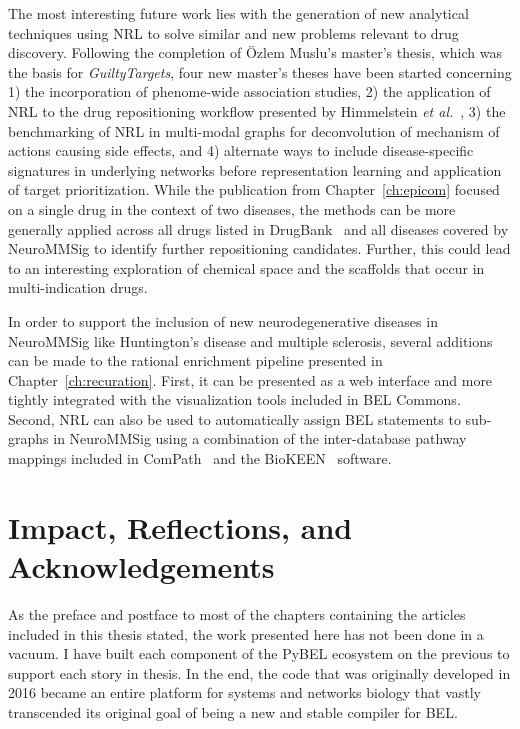 The most interesting future work lies with the generation of new analytical techniques using \ac{NRL} to solve similar and new problems relevant to drug discovery.
Following the completion of \"{O}zlem Muslu's master's thesis, which was the basis for \textit{GuiltyTargets}, four new master's theses have been started concerning 1) the incorporation of phenome-wide association studies, 2) the application of \ac{NRL} to the drug repositioning workflow presented by Himmelstein \textit{et al.}~\cite{Himmelstein2017}, 3) the benchmarking of \ac{NRL} in multi-modal graphs for deconvolution of mechanism of actions causing side effects, and 4) alternate ways to include disease-specific signatures in underlying networks before representation learning and application of target prioritization.
While the publication from Chapter~\ref{ch:epicom} focused on a single drug in the context of two diseases, the methods can be more generally applied across all drugs listed in DrugBank~\cite{Wishart2018} and all diseases covered by NeuroMMSig to identify further repositioning candidates.
Further, this could lead to an interesting exploration of chemical space and the scaffolds that occur in multi-indication drugs.

In order to support the inclusion of new neurodegenerative diseases in NeuroMMSig like Huntington's disease and multiple sclerosis, several additions can be made to the rational enrichment pipeline presented in Chapter~\ref{ch:recuration}.
First, it can be presented as a web interface and more tightly integrated with the visualization tools included in BEL Commons.
Second, \ac{NRL} can also be used to automatically assign \ac{BEL} statements to sub-graphs in NeuroMMSig using a combination of the inter-database pathway mappings included in ComPath~\cite{Domingo-Fernandez2018} and the BioKEEN~\cite{Ali2019} software.

\section{Impact, Reflections, and Acknowledgements}

As the preface and postface to most of the chapters containing the articles included in this thesis stated, the work presented here has not been done in a vacuum.
I have built each component of the PyBEL ecosystem on the previous to support each story in thesis.
In the end, the code that was originally developed in 2016 became an entire platform for systems and networks biology that vastly transcended its original goal of being a new and stable compiler for \ac{BEL}.

